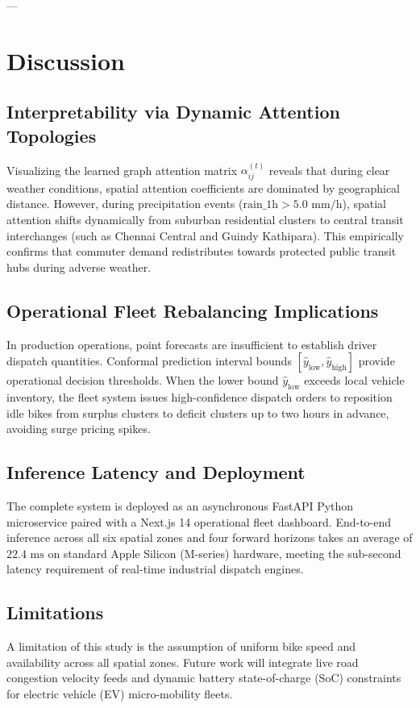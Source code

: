 \documentclass[10pt,journal,compsoc]{IEEEtran}
\begin{document}
---

\section{Discussion}

\subsection{Interpretability via Dynamic Attention Topologies}
Visualizing the learned graph attention matrix $\alpha_{ij}^{(t)}$ reveals that during clear weather conditions, spatial attention coefficients are dominated by geographical distance. However, during precipitation events ($\text{rain\_1h} > 5.0\text{ mm/h}$), spatial attention shifts dynamically from suburban residential clusters to central transit interchanges (such as Chennai Central and Guindy Kathipara). This empirically confirms that commuter demand redistributes towards protected public transit hubs during adverse weather.

\subsection{Operational Fleet Rebalancing Implications}
In production operations, point forecasts are insufficient to establish driver dispatch quantities. Conformal prediction interval bounds $[\hat{y}_{\text{low}}, \hat{y}_{\text{high}}]$ provide operational decision thresholds. When the lower bound $\hat{y}_{\text{low}}$ exceeds local vehicle inventory, the fleet system issues high-confidence dispatch orders to reposition idle bikes from surplus clusters to deficit clusters up to two hours in advance, avoiding surge pricing spikes.

\subsection{Inference Latency and Deployment}
The complete system is deployed as an asynchronous FastAPI Python microservice paired with a Next.js 14 operational fleet dashboard. End-to-end inference across all six spatial zones and four forward horizons takes an average of $22.4\text{ ms}$ on standard Apple Silicon (M-series) hardware, meeting the sub-second latency requirement of real-time industrial dispatch engines.

\subsection{Limitations}
A limitation of this study is the assumption of uniform bike speed and availability across all spatial zones. Future work will integrate live road congestion velocity feeds and dynamic battery state-of-charge (SoC) constraints for electric vehicle (EV) micro-mobility fleets.
\end{document}
